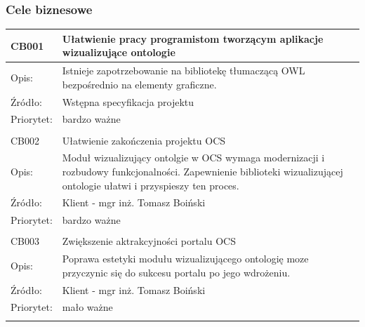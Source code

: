 
\subsubsection{Cele biznesowe}




\begin{center}
\begin{tabular}{|m{3cm}|m{9cm}|} \hline

CB001 & Ułatwienie pracy programistom tworzącym aplikacje wizualizujące ontologie  \\ \hline
Opis: & Istnieje zapotrzebowanie na bibliotekę tłumaczącą OWL bezpośrednio na elementy graficzne.  \\ \hline
Źródło: & Wstępna specyfikacja projektu \\ \hline
Priorytet: & bardzo ważne \\ \hline
\multicolumn{2}{c}{} \\


 \hline
CB002 & Ułatwienie zakończenia projektu OCS   \\ \hline
Opis: & Moduł wizualizujący ontolgie w OCS wymaga modernizacji i rozbudowy funkcjonalności. Zapewnienie biblioteki wizualizującej ontologie ułatwi i przyspieszy ten proces.  \\ \hline
Źródło:& Klient - mgr inż. Tomasz Boiński   \\ \hline
Priorytet: & bardzo ważne \\ \hline
\multicolumn{2}{c}{} \\
 \hline
CB003 & Zwiększenie aktrakcyjności portalu OCS   \\ \hline
Opis: & Poprawa estetyki modułu wizualizującego ontologię moze przyczynic się do sukcesu portalu po jego wdrożeniu.  \\ \hline
Źródło: & Klient - mgr inż. Tomasz Boiński \\ \hline
Priorytet: & mało ważne \\ \hline
\multicolumn{2}{c}{} \\
\end{tabular}


\end{center}

